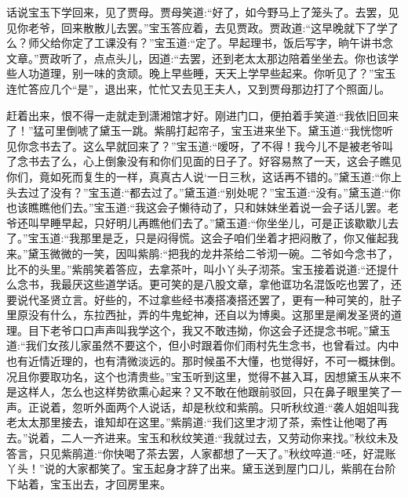 


\begin{parag}
    话说宝玉下学回来，见了贾母。贾母笑道:“好了，如今野马上了笼头了。去罢，见见你老爷，回来散散儿去罢。”宝玉答应着，去见贾政。贾政道:“这早晚就下了学了么？师父给你定了工课没有？”宝玉道:“定了。早起理书，饭后写字，晌午讲书念文章。”贾政听了，点点头儿，因道:“去罢，还到老太太那边陪着坐坐去。你也该学些人功道理，别一味的贪顽。晚上早些睡，天天上学早些起来。你听见了？”宝玉连忙答应几个“是”，退出来，忙忙又去见王夫人，又到贾母那边打了个照面儿。
\end{parag}


\begin{parag}
    赶着出来，恨不得一走就走到潇湘馆才好。刚进门口，便拍着手笑道:“我依旧回来了！”猛可里倒唬了黛玉一跳。紫鹃打起帘子，宝玉进来坐下。黛玉道:“我恍惚听见你念书去了。这么早就回来了？”宝玉道:“嗳呀，了不得！我今儿不是被老爷叫了念书去了么，心上倒象没有和你们见面的日子了。好容易熬了一天，这会子瞧见你们，竟如死而复生的一样，真真古人说‘一日三秋，这话再不错的。”黛玉道:“你上头去过了没有？”宝玉道:“都去过了。”黛玉道:“别处呢？”宝玉道:“没有。”黛玉道:“你也该瞧瞧他们去。”宝玉道:“我这会子懒待动了，只和妹妹坐着说一会子话儿罢。老爷还叫早睡早起，只好明儿再瞧他们去了。”黛玉道:“你坐坐儿，可是正该歇歇儿去了。”宝玉道:“我那里是乏，只是闷得慌。这会子咱们坐着才把闷散了，你又催起我来。”黛玉微微的一笑，因叫紫鹃:“把我的龙井茶给二爷沏一碗。二爷如今念书了，比不的头里。”紫鹃笑着答应，去拿茶叶，叫小丫头子沏茶。宝玉接着说道:“还提什么念书，我最厌这些道学话。更可笑的是八股文章，拿他诓功名混饭吃也罢了，还要说代圣贤立言。好些的，不过拿些经书凑搭凑搭还罢了，更有一种可笑的，肚子里原没有什么，东拉西扯，弄的牛鬼蛇神，还自以为博奥。这那里是阐发圣贤的道理。目下老爷口口声声叫我学这个，我又不敢违拗，你这会子还提念书呢。”黛玉道:“我们女孩儿家虽然不要这个，但小时跟着你们雨村先生念书，也曾看过。内中也有近情近理的，也有清微淡远的。那时候虽不大懂，也觉得好，不可一概抹倒。况且你要取功名，这个也清贵些。”宝玉听到这里，觉得不甚入耳，因想黛玉从来不是这样人，怎么也这样势欲熏心起来？又不敢在他跟前驳回，只在鼻子眼里笑了一声。正说着，忽听外面两个人说话，却是秋纹和紫鹃。只听秋纹道:“袭人姐姐叫我老太太那里接去，谁知却在这里。”紫鹃道:“我们这里才沏了茶，索性让他喝了再去。”说着，二人一齐进来。宝玉和秋纹笑道:“我就过去，又劳动你来找。”秋纹未及答言，只见紫鹃道:“你快喝了茶去罢，人家都想了一天了。”秋纹啐道:“呸，好混账丫头！”说的大家都笑了。宝玉起身才辞了出来。黛玉送到屋门口儿，紫鹃在台阶下站着，宝玉出去，才回房里来。
\end{parag}


